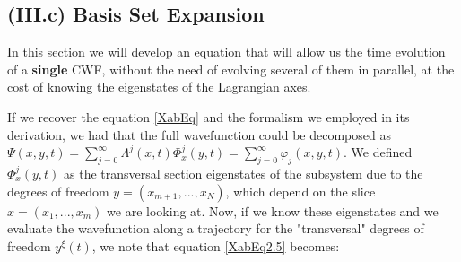 \documentclass[11pt, a4paper]{article} %
\begin{document}
\subsection*{(III.c) Basis Set Expansion}
In this section we will develop an equation that will allow us the time evolution of a {\bf single} CWF, without the need of evolving several of them in parallel, at the cost of knowing the eigenstates of the Lagrangian axes.

If we recover the equation \eqref{XabEq} and the formalism we employed in its derivation, we had that the full wavefunction could be decomposed as $\Psi(x,y,t)=\sum_{j=0}^\infty\Lambda^j(x,t)\Phi^j_x(y,t)=\sum_{j=0}^\infty \varphi_j(x,y,t)$. We defined $\Phi^j_x(y,t)$ as the transversal section eigenstates of the subsystem due to the degrees of freedom $y=(x_{m+1},...,x_N)$, which depend on the slice $x=(x_1,...,x_m)$ we are looking at. Now, if we know these eigenstates and we evaluate the wavefunction along a trajectory for the "transversal" degrees of freedom $y^\xi(t)$, we note that equation \eqref{XabEq2.5} becomes:
\end{document}
